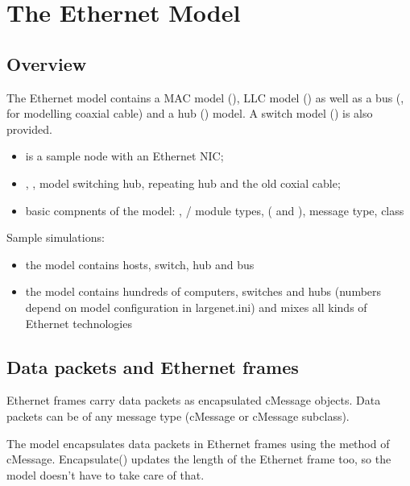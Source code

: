 \chapter{The Ethernet Model}
\label{cha:ethernet}


\section{Overview}

The Ethernet model contains a MAC model (), LLC model () as well
as a bus (, for modelling coaxial cable) and a hub () model.
A switch model () is also provided.

\begin{itemize}
  \item {} is a sample node with an Ethernet NIC;
  \item {}, ,  model switching hub, repeating hub and
        the old coxial cable;
  \item basic compnents of the model: , / module types,
         ( and ),  message type,
         class
\end{itemize}

Sample simulations:

\begin{itemize}
  \item the  model contains hosts, switch, hub and bus
  \item the  model contains hundreds of computers, switches and hubs
        (numbers depend on model configuration in largenet.ini) and mixes all
        kinds of Ethernet technologies
\end{itemize}


\section{Data packets and Ethernet frames}

Ethernet frames carry data packets as encapsulated cMessage objects.
Data packets can be of any message type (cMessage or cMessage subclass).

The model encapsulates data packets in Ethernet frames using the 
method of cMessage. Encapsulate() updates the length of the Ethernet frame too,
so the model doesn't have to take care of that.

